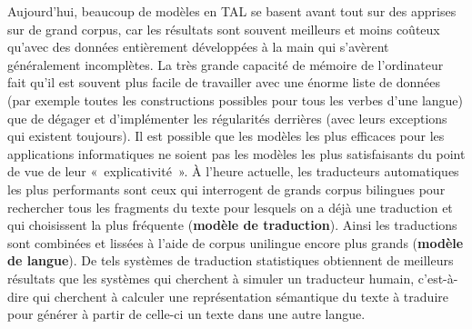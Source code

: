 Aujourd’hui, beaucoup de modèles en TAL se basent avant tout sur des   apprises sur de grand corpus, car les résultats sont souvent meilleurs et moins coûteux qu’avec des données entièrement développées à la main qui s’avèrent généralement incomplètes. La très grande capacité de mémoire de l’ordinateur fait qu’il est souvent plus facile de travailler avec une énorme liste de données (par exemple toutes les constructions possibles pour tous les verbes d’une langue) que de dégager et d’implémenter les régularités derrières (avec leurs exceptions qui existent toujours). Il est possible que les modèles les plus efficaces pour les applications informatiques ne soient pas les modèles les plus satisfaisants du point de vue de leur «~explicativité~». À l’heure actuelle, les traducteurs automatiques les plus performants sont ceux qui interrogent de grands corpus bilingues pour rechercher tous les fragments du texte pour lesquels on a déjà une traduction et qui choisissent la plus fréquente (\textbf{modèle de traduction}). Ainsi les traductions sont combinées et lissées à l’aide de corpus unilingue encore plus grands (\textbf{modèle de langue}). De tels systèmes de traduction statistiques obtiennent de meilleurs résultats que les systèmes qui cherchent à simuler un traducteur humain, c’est-à-dire qui cherchent à calculer une représentation sémantique du texte à traduire pour générer à partir de celle-ci un texte dans une autre langue.

